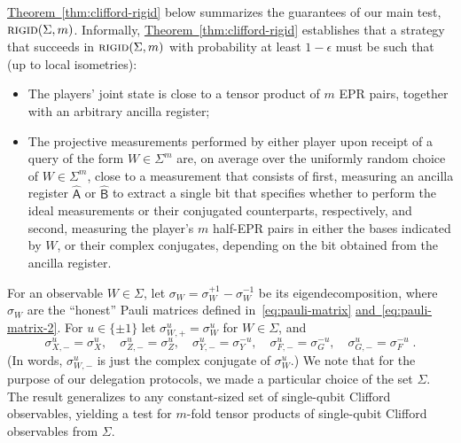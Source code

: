 \documentclass[11pt]{article}
\numberwithin{equation}{section}
\theoremstyle{definition}
\theoremstyle{plain}
\newcommand{\expref}[2]{\hyperref[#2]{#1~\ref{#2}}}
\newcommand{\expeqref}[2]{\hyperref[#2]{#1~\eqref{#2}}}
\newcommand{\reg}[1]{{\textsf{#1}}}
\newcommand{\rigid}{\textsc{rigid}}
\begin{document}
\expref{Theorem}{thm:clifford-rigid} below summarizes the guarantees of our main
test,  $\rigid(\Sigma,m)$. Informally, \expref{Theorem}{thm:clifford-rigid} establishes that a strategy that succeeds in $\rigid(\Sigma,m)$ with probability at least  $1-\epsilon$ must be such that (up to local isometries):
\begin{itemize}
    \item The players' joint state is close to a tensor product of $m$ EPR pairs, together with an arbitrary ancilla register;
    \item The projective measurements performed by either player upon receipt of a query of the form $W\in\Sigma^m$ are, on average over the uniformly random choice of $W\in\Sigma^m$, close to a measurement that consists of first, measuring an ancilla register $\hat{\reg{A}}$ or $\hat{\reg{B}}$
%
to extract a single bit that specifies whether to perform the ideal measurements or their conjugated counterparts, 
respectively, %
and second, measuring the player's $m$ half-EPR pairs in either the bases indicated by $W$, or their complex %
conjugates,  %
depending on the bit obtained from the ancilla register. 
\end{itemize}

For an observable $W\in\Sigma$, let $\sigma_W = \sigma_W^{+1} - \sigma_W^{-1}$ be its eigendecomposition, where $\sigma_W$ are the ``honest'' Pauli matrices defined in~\eqref{eq:pauli-matrix} \expeqref{and}{eq:pauli-matrix-2}. For $u\in\{\pm 1\}$ let $\sigma_{W,+}^u = \sigma_W^u$ for $W\in \Sigma$, and 
$$ \sigma_{X,-}^u = \sigma_X^u,\quad\sigma_{Z,-}^u = \sigma_Z^u,\quad\sigma_{Y,-}^u = \sigma_Y^{-u},\quad\sigma_{F,-}^u = \sigma_G^{-u},\quad\sigma_{G,-}^u = \sigma_F^{-u}\;.$$
(In words, $\sigma_{W,-}^u$ is just the complex conjugate of $\sigma_W^u$.) We note that for the purpose of our delegation protocols, we made a particular choice of the set $\Sigma$. The result generalizes to any constant-sized set of single-qubit Clifford observables,  yielding a test for $m$-fold tensor products of single-qubit Clifford observables from $\Sigma$.
\end{document}
